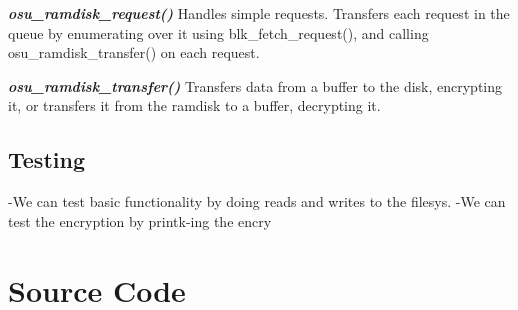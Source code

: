 \textbf{\emph{osu\_ramdisk\_request()}} Handles simple requests.
Transfers each request in the queue by enumerating over it using
blk\_fetch\_request(), and calling osu\_ramdisk\_transfer() on each
request.

\textbf{\emph{osu\_ramdisk\_transfer()}} Transfers data from a buffer to
the disk, encrypting it, or transfers it from the ramdisk to a buffer,
decrypting it.

\subsection{Testing}

-We can test basic functionality by doing reads and writes to the
filesys. -We can test the encryption by printk-ing the encry

\section{Source Code}
